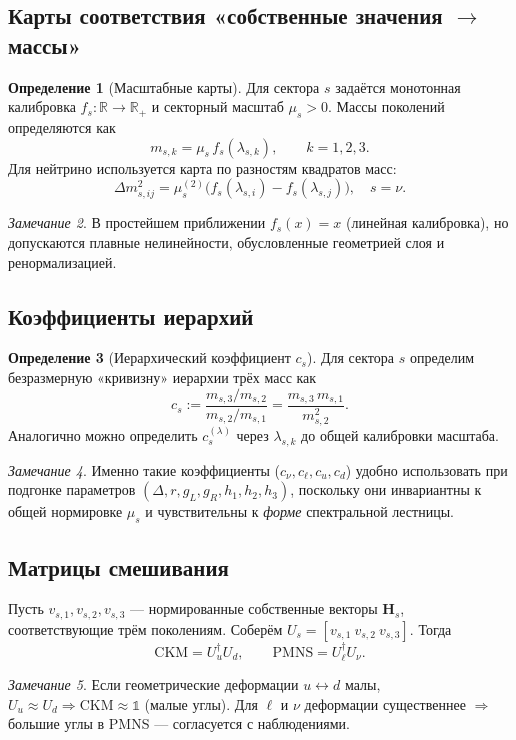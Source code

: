 \documentclass[12pt,a4paper]{article}
\theoremstyle{definition}
\newtheorem{definition}{Определение}[section]
\theoremstyle{plain}
\theoremstyle{remark}
\newtheorem{remark}[definition]{Замечание}
\newcommand{\Hs}{\mathbf{H}_{s}}
\newcommand{\R}{\mathbb{R}}
\begin{document}
\subsection{Карты соответствия «собственные значения \(\to\) массы»}
\begin{definition}[Масштабные карты]
Для сектора \(s\) задаётся монотонная калибровка \(f_s:\R\to\R_+\) и секторный масштаб \(\mu_s>0\). Массы поколений определяются как
\[
m_{s,k}=\mu_s\,f_s(\lambda_{s,k}),\qquad k=1,2,3.
\]
Для нейтрино используется карта по разностям квадратов масс:
\[
\Delta m^2_{s,ij}=\mu_s^{(2)}\Big(f_s(\lambda_{s,i})-f_s(\lambda_{s,j})\Big),\quad s=\nu.
\]
\end{definition}

\begin{remark}
В простейшем приближении \(f_s(x)=x\) (линейная калибровка), но допускаются плавные нелинейности, обусловленные геометрией слоя и ренормализацией.
\end{remark}

\subsection{Коэффициенты иерархий}
\begin{definition}[Иерархический коэффициент \(c_s\)]
Для сектора \(s\) определим безразмерную «кривизну» иерархии трёх масс как
\[
c_s:=\frac{m_{s,3}/m_{s,2}}{m_{s,2}/m_{s,1}}=\frac{m_{s,3}\,m_{s,1}}{m_{s,2}^2}.
\]
Аналогично можно определить \(c_s^{(\lambda)}\) через \(\lambda_{s,k}\) до общей калибровки масштаба.
\end{definition}

\begin{remark}
Именно такие коэффициенты (\(c_\nu,c_\ell,c_u,c_d\)) удобно использовать при подгонке параметров \((\Delta,r,g_L,g_R,h_1,h_2,h_3)\), поскольку они инвариантны к общей нормировке \(\mu_s\) и чувствительны к \emph{форме} спектральной лестницы.
\end{remark}

\subsection{Матрицы смешивания}
Пусть \(v_{s,1},v_{s,2},v_{s,3}\) --- нормированные собственные векторы \(\Hs\), соответствующие трём поколениям. Соберём \(U_s=[v_{s,1}\ v_{s,2}\ v_{s,3}]\). Тогда
\[
\mathrm{CKM}=U_u^\dagger U_d,\qquad \mathrm{PMNS}=U_\ell^\dagger U_\nu.
\]
\begin{remark}
Если геометрические деформации \(u\leftrightarrow d\) малы, \(U_u\approx U_d\Rightarrow \mathrm{CKM}\approx\mathbb{1}\) (малые углы). Для \(\ell\) и \(\nu\) деформации существеннее \(\Rightarrow\) большие углы в PMNS --- согласуется с наблюдениями.
\end{remark}
\end{document}
